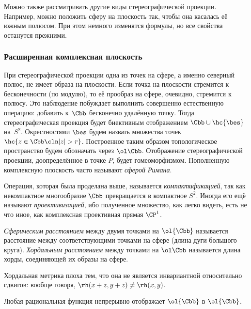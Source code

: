 \documentclass[a4paper]{article}
\begin{document}
\begin{note}
Можно также рассматривать другие виды стереографической проекции. Например, можно положить сферу на плоскость так, чтобы
она касалась её южным полюсом.  При этом немного изменятся формулы, но все свойства останутся прежними.
\end{note}

\subsubsection{Расширенная комплексная плоскость}

При стереографической проекции одна из точек на сфере, а именно северный полюс, не имеет образа на плоскости.
Если точка на плоскости стремится к бесконечности (по модулю), то её прообраз на сфере, очевидно, стремится
к полюсу. Это наблюдение побуждает выполнить совершенно естественную операцию: добавить к~$\Cbb$ бесконечно
удалённую точку. Тогда стереографическая проекция будет биективным отображением $\Cbb \cup \hc{\bes}$ на~$S^2$.
Окрестностями $\bes$ будем назвать множества точек $\hc{z \in \Cbb \cln |z| > r}$. Построенное таким образом
топологическое пространство будем обозначать через $\ol\Cbb$. Отображение стереографической проекции, доопределённое
в точке $P$, будет гомеоморфизмом. Пополненную комплексную плоскость часто называют \emph{сферой Римана}.

\begin{note}
Операция, которая была проделана выше, называется \emph{компактификацией}, так как некомпактное многообразие
$\Cbb$ превращается в компактное $S^2$. Иногда его ещё называют \emph{проективизацией}, ибо полученное
множество, как легко видеть, есть не что иное, как комплексная проективная прямая $\CP^1$.
\end{note}

\begin{df}
\emph{Сферическим расстоянием} между двумя точками на $\ol{\Cbb}$ называется расстояние между соответствующими точками
на сфере (длина дуги большого круга). \emph{Хордальным расстоянием} между точками на $\ol\Cbb$ называется
длина хорды, соединяющей их образы на сфере.
\end{df}

\begin{note}
Хордальная метрика плоха тем, что она не является инвариантной относительно сдвигов: вообще говоря,
$\rh(x+z,y+z)\neq \rh(x,y)$.
\end{note}

\begin{note}
Любая рациональная функция непрерывно отображает $\ol{\Cbb}$ в $\ol{\Cbb}$.
\end{note}
\end{document}
